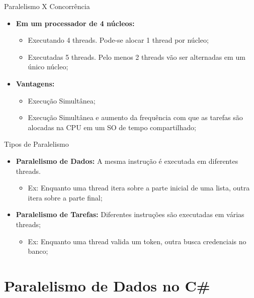 \documentclass[10pt]{beamer}
\begin{document}
\begin{frame}{Paralelismo X Concorrência}
	\begin{itemize}
		\item \textbf{Em um processador de 4 núcleos:}
		\begin{itemize}
			\item Executando 4 threads. Pode-se alocar 1 thread por núcleo;
			\vspace{0.2cm}
			\item Executadas 5 threads. Pelo menos 2 threads vão ser alternadas em um único núcleo;
		\end{itemize}
	\end{itemize}
	\begin{itemize}
		\item \textbf{Vantagens:}
		\begin{itemize}
			\item Execução Simultânea;
			\vspace{0.2cm}
			\item Execução Simultânea e aumento da frequência com que as tarefas são alocadas na CPU em um SO de tempo compartilhado;
		\end{itemize}
	\end{itemize}
\end{frame}

\begin{frame}{Tipos de Paralelismo}
	\begin{itemize}
		\item \textbf{Paralelismo de Dados:} A mesma instrução é executada em diferentes threads.
		\begin{itemize}
			\item Ex: Enquanto uma thread itera sobre a parte inicial de uma lista, outra itera sobre a parte final; 
		\end{itemize}
		\vspace{0.2cm}
		\item \textbf{Paralelismo de Tarefas:} Diferentes instruções são executadas em várias threads;
		\begin{itemize}
			\item Ex: Enquanto uma thread valida um token, outra busca credenciais no banco;
		\end{itemize}
	\end{itemize}
\end{frame}

\section{Paralelismo de Dados no C\#}
\end{document}
